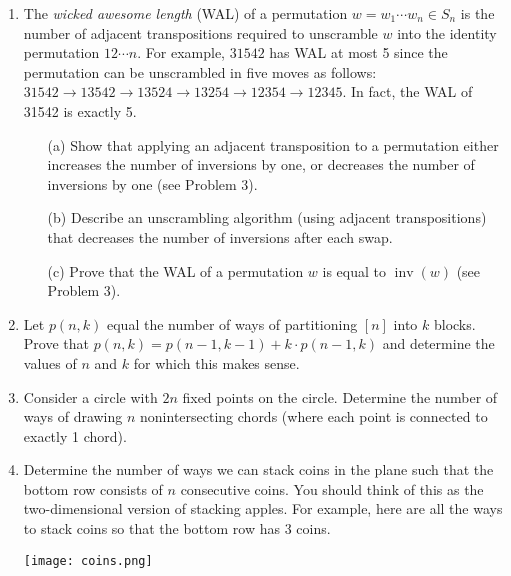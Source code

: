 \documentclass[11pt]{scrartcl}
\theoremstyle{definition}
\newcommand{\inv}{\operatorname{inv}}
\begin{document}
\begin{enumerate}

\item The \emph{wicked awesome length} (WAL) of a permutation $w=w_1\cdots w_n\in S_n$ is the number of adjacent transpositions required to unscramble $w$ into the identity permutation $12\cdots n$. For example, $31542$ has WAL at most 5 since the permutation can be unscrambled in five moves as follows: $31542 \to 13542 \to 13524 \to 13254 \to 12354 \to 12345$. In fact, the WAL of 31542 is exactly 5.
\begin{enumerate}
\item[(a)]  Show that applying an adjacent transposition to a permutation either increases the number of inversions by one, or decreases the number of inversions by one (see Problem 3).
\item[(b)] Describe an unscrambling algorithm (using adjacent transpositions) that decreases the number of inversions after each swap.
\item[(c)] Prove that the WAL of a permutation $w$ is equal to $\inv(w)$ (see Problem 3).
\end{enumerate}

\item Let $p(n,k)$ equal the number of ways of partitioning $[n]$ into $k$ blocks.  Prove that $p(n,k)=p(n-1,k-1)+k\cdot p(n-1,k)$ and determine the values of $n$ and $k$ for which this makes sense.

\item Consider a circle with $2n$ fixed points on the circle.  Determine the number of ways of drawing $n$ nonintersecting chords (where each point is connected to exactly 1 chord).

\item Determine the number of ways we can stack coins in the plane such that the bottom row consists of $n$ consecutive coins.  You should think of this as the two-dimensional version of stacking apples.  For example, here are all the ways to stack coins so that the bottom row has 3 coins.
\begin{center}
\texttt{[image: coins.png]}
\end{center}


\end{enumerate}
\end{document}
